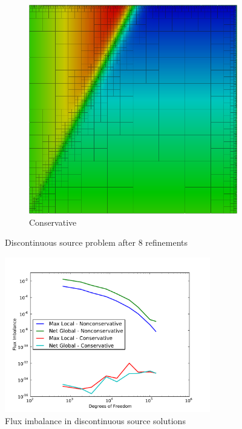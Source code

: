 \documentclass[letterpaper]{article}
\begin{document}
\begin{figure}[p]
\begin{subfigure}[t]{0.45\textwidth}
\includegraphics[width=\textwidth]{figs/Discontinuous/modified8c.png}
\caption{Conservative}
\label{fig:discontinuousModified8c}
\end{subfigure}
\caption{Discontinuous source problem after 8 refinements}
\label{fig:discontinuous}
\end{figure}

\begin{figure}[p]
\centering
\includegraphics[width=0.8\textwidth]{figs/Discontinuous/modifiedFlux.pdf}
\caption{Flux imbalance in discontinuous source solutions}
\label{fig:discontinuous_flux}
\end{figure}
\end{document}
